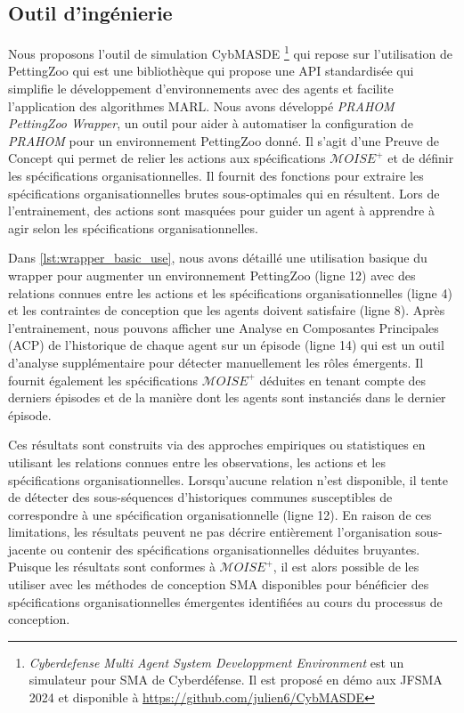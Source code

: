 \documentclass[contribution]{jfsma}
\newcounter{relation}
\begin{document}
\subsection{Outil d'ingénierie}

Nous proposons l'outil de simulation CybMASDE \footnote{\emph{Cyberdefense Multi Agent System Developpment Environment} est un simulateur pour SMA de Cyberdéfense. Il est proposé en démo aux JFSMA 2024 et disponible à \url{https://github.com/julien6/CybMASDE}} qui repose sur l'utilisation de PettingZoo qui est une bibliothèque qui propose une API standardisée qui simplifie le développement d'environnements avec des agents et facilite l'application des algorithmes MARL.
Nous avons développé \emph{PRAHOM PettingZoo Wrapper}\label{PettingZoo-wrapper}, un outil pour aider à automatiser la configuration de \emph{PRAHOM} pour un environnement PettingZoo donné.
Il s'agit d'une Preuve de Concept qui permet de relier les actions aux spécifications $\mathcal{M}OISE^+$ et de définir les spécifications organisationnelles. Il fournit des fonctions pour extraire les spécifications organisationnelles brutes sous-optimales qui en résultent. Lors de l'entrainement, des actions sont masquées pour guider un agent à apprendre à agir selon les spécifications organisationnelles.

Dans \autoref{lst:wrapper_basic_use}, nous avons détaillé une utilisation basique du wrapper pour augmenter un environnement PettingZoo (ligne 12) avec des relations connues entre les actions et les spécifications organisationnelles (ligne 4) et les contraintes de conception que les agents doivent satisfaire (ligne 8). Après l'entrainement, nous pouvons afficher une Analyse en Composantes Principales (ACP) de l'historique de chaque agent sur un épisode (ligne 14) qui est un outil d'analyse supplémentaire pour détecter manuellement les rôles émergents. Il fournit également les spécifications $\mathcal{M}OISE^+$ déduites en tenant compte des derniers épisodes et de la manière dont les agents sont instanciés dans le dernier épisode.

Ces résultats sont construits via des approches empiriques ou statistiques en utilisant les relations connues entre les observations, les actions et les spécifications organisationnelles. Lorsqu'aucune relation n'est disponible, il tente de détecter des sous-séquences d'historiques communes susceptibles de correspondre à une spécification organisationnelle (ligne 12). En raison de ces limitations, les résultats peuvent ne pas décrire entièrement l’organisation sous-jacente ou contenir des spécifications organisationnelles déduites bruyantes. Puisque les résultats sont conformes à $\mathcal{M}OISE^+$, il est alors possible de les utiliser avec les méthodes de conception SMA disponibles pour bénéficier des spécifications organisationnelles émergentes identifiées au cours du processus de conception.
\end{document}

